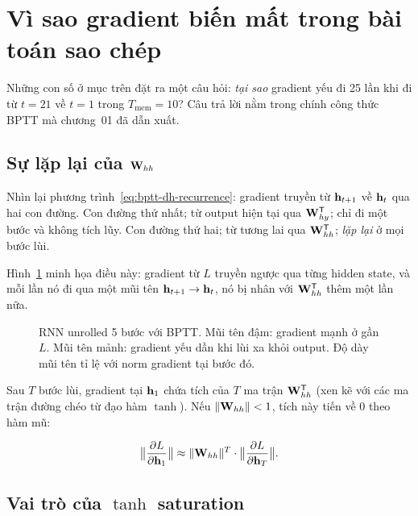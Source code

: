 %

\section{Vì sao gradient biến mất trong bài toán sao chép}
\label{sec:ch02-vi-sao}

Những con số ở mục trên đặt ra một câu hỏi: \emph{tại sao} gradient yếu đi 25
lần khi đi từ $t = 21$ về $t = 1$ trong
 $T_{\text{mem}} =
10$? Câu trả lời nằm trong chính công thức BPTT mà chương~01 đã dẫn xuất.

\subsection{Sự lặp lại của $\mathbf{W}_{hh}$}

Nhìn lại phương trình~\eqref{eq:bptt-dh-recurrence}: gradient truyền từ
$\mathbf{h}_{t+1}$ về $\mathbf{h}_t$ qua hai con đường. Con đường thứ nhất; từ
output hiện tại qua $\mathbf{W}_{hy}^{\mathsf{T}}$; chỉ đi một bước và không tích
lũy. Con đường thứ hai; từ tương lai qua $\mathbf{W}_{hh}^{\mathsf{T}}$; \emph{lặp
lại} ở mọi bước lùi.

Hình~\ref{fig:ch02-rnn-gradient} minh họa điều này: gradient từ $L$ truyền
ngược qua từng hidden state, và mỗi lần nó đi qua một mũi tên $\mathbf{h}_{t+1}
\to \mathbf{h}_t$, nó bị nhân với $\mathbf{W}_{hh}^{\mathsf{T}}$ thêm một lần nữa.

\begin{figure}[ht]
  \centering
  
  \caption{RNN unrolled 5 bước với BPTT. Mũi tên đậm: gradient mạnh ở gần $L$.
    Mũi tên mảnh: gradient yếu dần khi lùi xa khỏi output. Độ dày mũi tên tỉ
    lệ với norm gradient tại bước đó.}
  \label{fig:ch02-rnn-gradient}
\end{figure}

Sau $T$ bước lùi, gradient tại $\mathbf{h}_1$ chứa tích của $T$ ma trận
$\mathbf{W}_{hh}^{\mathsf{T}}$ (xen kẽ với các ma trận đường chéo từ đạo hàm
$\tanh$). Nếu $\|\mathbf{W}_{hh}\| < 1$, tích này tiến về 0 theo hàm mũ:

\[
\bigl\|\frac{\partial L}{\partial \mathbf{h}_1}\bigr\|
\approx \|\mathbf{W}_{hh}\|^T \cdot \bigl\|\frac{\partial L}{\partial \mathbf{h}_T}\bigr\|.
\]

\subsection{Vai trò của $\tanh$ saturation}

